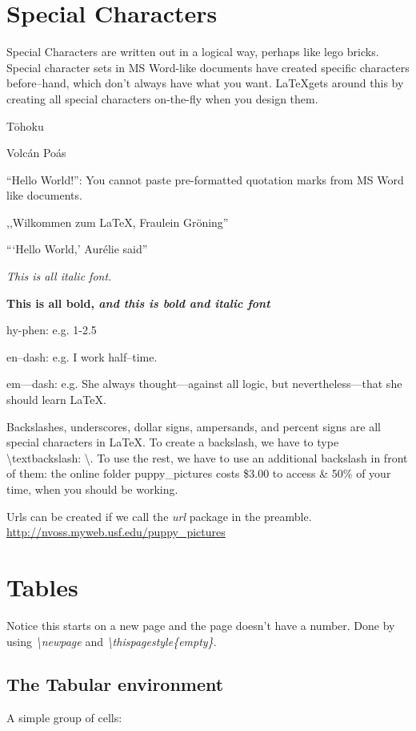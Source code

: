 \documentclass[12pt]{article}
\begin{document}
\section{Special Characters}
Special Characters are written out in a logical way, perhaps like lego bricks. Special character sets in MS Word-like documents have created specific characters before--hand, which don't always have what you want. \LaTeX gets around this by creating all special characters on-the-fly when you design them.

T\={o}hoku

Volc\'an Po\'as

``Hello World!'': You cannot paste pre-formatted quotation marks from MS Word like documents. 

,,Wilkommen zum \LaTeX, Fraulein Gr\"oning''

```Hello World,' Aur\'elie said''

\textit{This is all italic font.}

\textbf{This is all bold, \textit{and this is bold and italic font}}

hy-phen: e.g. 1-2.5

en--dash: e.g. I work half--time.

em---dash: e.g. She always thought---against all logic, but nevertheless---that she should learn \LaTeX.

Backslashes, underscores, dollar signs, ampersands, and percent signs are all special characters in \LaTeX. To create a backslash, we have to type \textbackslash textbackslash: \textbackslash. To use the rest, we have to use an additional backslash in front of them: the online folder puppy\_pictures costs \$3.00 to access \& 50\% of your time, when you should be working.

Urls can be created if we call the \textit{url} package in the preamble. \url{http://nvoss.myweb.usf.edu/puppy_pictures} %

\newpage %
\thispagestyle{empty} %

\section{Tables}
Notice this starts on a new page and the page doesn't have a number. Done by using \textit{\textbackslash newpage} and \textit{\textbackslash thispagestyle\{empty\}}.

\subsection{The Tabular environment}
A simple group of cells:
\end{document}
